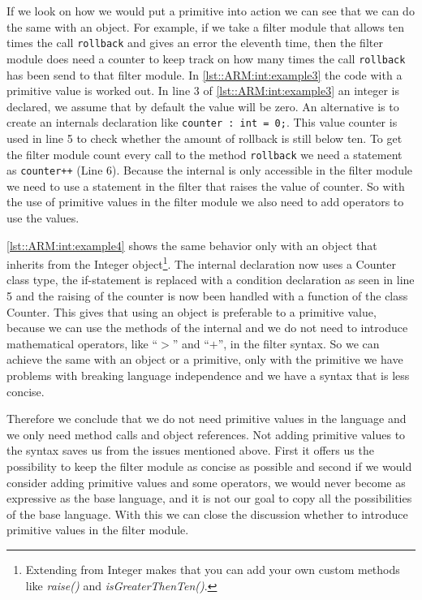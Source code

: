 If we look on how we would put a primitive into action
we can see that we can do the same with an object. For example, if we take a filter module that allows
ten times the call \lstinline!rollback! and gives an error the eleventh time, then the filter module
does need a counter to keep track on how many times the call \lstinline!rollback! has been send to that
filter module. In \autoref{lst::ARM:int:example3} the code with a primitive value is worked out.
In line 3 of \autoref{lst::ARM:int:example3} an integer is declared, we assume that by default the value will be zero. An alternative is to create an internals declaration like
\lstinline!counter : int = 0;!. This value counter is used in line 5 to check whether the amount of rollback is still
below ten. To get the filter module count every call to the method \lstinline!rollback! we need
a statement as \lstinline!counter++! (Line 6). Because the internal is only accessible in the filter module we need
to use a statement in the filter that raises the value of counter.
So with the use of primitive values in the filter module we also need to add operators to use the values.

\autoref{lst::ARM:int:example4} shows the same behavior only with an object that inherits from the
Integer object\footnote{Extending from Integer makes that you can add your own custom methods like \emph{raise()} and
\emph{isGreaterThenTen()}.}.
The internal declaration now uses a Counter class type, the if-statement is replaced with a condition declaration as seen in line 5 and the raising of the counter is now been handled with a function of the class Counter.
This gives that using an object is preferable to a primitive value, because we can use the
methods of the internal and we do not need to introduce mathematical operators, like
``$>$'' and ``$+$'', in the filter syntax. So we can achieve the same with an object or a primitive,
only with the primitive we have problems with breaking language independence and
we have a syntax that is less concise.

Therefore we conclude that we do not need primitive values in the language and we only need method calls
and object references.
Not adding primitive values to the syntax saves us
from the issues mentioned above. First it offers us the possibility to keep the filter module as concise as possible and
second if we would consider adding primitive values and some operators, we would never become as expressive
as the base language, and it is not our goal to copy all the possibilities of the base language.
With this we can close the discussion whether to introduce primitive values in
the filter module.

